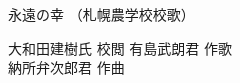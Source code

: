 \documentclass[10pt,b5j]{tarticle} %
\begin{document}
\begin{minipage}[c]{0.7\hsize} %
    \begin{center}
        {\LARGE
            永遠の幸 %
        }
        {\small 
            （札幌農学校校歌） %
        }
    \end{center}
\end{minipage}
\begin{minipage}[c]{0.3\hsize} %
    \begin{flushright} %
        大和田建樹氏 校閲 有島武朗君 作歌\\納所弁次郎君 作曲 %
    \end{flushright}
\end{minipage}
\end{document}
